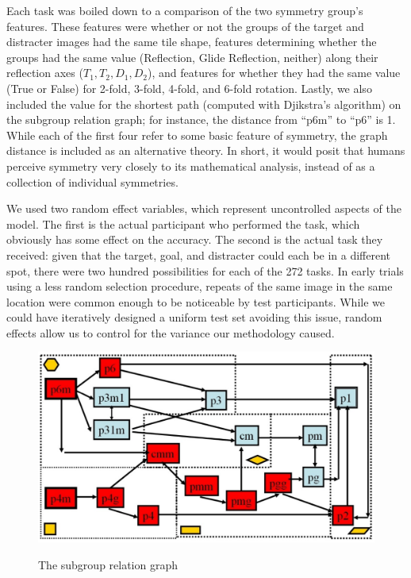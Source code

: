 Each task was boiled down to a comparison of the two symmetry group’s features. These features were whether or not the groups of the target and distracter images had the same tile shape, features determining whether the groups had the same value (Reflection, Glide Reflection, neither) along their reflection axes ($T_1, T_2, D_1, D_2$), and features for whether they had the same value (True or False) for 2-fold, 3-fold, 4-fold, and 6-fold rotation. Lastly, we also included the value for the shortest path (computed with Djikstra's algorithm) on the subgroup relation graph; for instance, the distance from “p6m” to “p6” is 1. While each of the first four refer to some basic feature of symmetry, the graph distance is included as an alternative theory. In short, it would posit that humans perceive symmetry very closely to its mathematical analysis, instead of as a collection of individual symmetries.

We used two random effect variables, which represent uncontrolled aspects of the model. The first is the actual participant who performed the task, which obviously has some effect on the accuracy. The second is the actual task they received: given that the target, goal, and distracter could each be in a different spot, there were two hundred possibilities for each of the 272 tasks. In early trials using a less random selection procedure, repeats of the same image in the same location were common enough to be noticeable by test participants. While we could have iteratively designed a uniform test set avoiding this issue, random effects allow us to control for the variance our methodology caused.

\begin{figure}[!ht]
\centering
\includegraphics[width=0.9\columnwidth]{Yanxi_Graph}
\label{graph}
\caption{The subgroup relation graph}
\end{figure}

